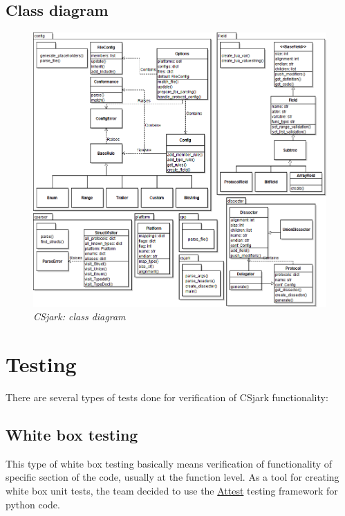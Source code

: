 \documentclass[A4paper,10pt,english]{sphinxmanual}
\begin{document}
\subsection{Class diagram}
\label{devel/design:class-diagram}\label{devel/design:class}\begin{figure}[htbp]
\centering
\capstart

\includegraphics[width=\linewidth]{img/class_diagram.png}
\caption{\emph{CSjark: class diagram}}\end{figure}


\section{Testing}
\label{devel/testing:testing}\label{devel/testing::doc}
There are several types of tests done for verification of CSjark functionality:


\subsection{White box testing}
\label{devel/testing:white-box-testing}
This type of white box testing basically means verification of functionality of specific section of the code, usually at the function level. As a tool for creating white box unit tests, the team decided to use the \href{http://packages.python.org/Attest/}{Attest} testing framework for python code.
\end{document}
